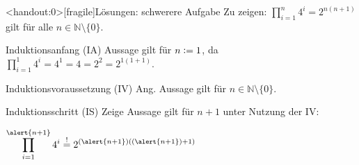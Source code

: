 {
\begin{frame}<handout:0>[fragile]{Lösungen: schwerere Aufgabe}
    Zu zeigen: $\displaystyle\prod_{i=1}^{n} 4^i = 2^{n(n+1)}$ gilt für alle $n \in \mathbb{N}\setminus \{0\}$.
    \begin{alertblock}{Induktionsanfang (IA)}
        Aussage gilt für $n\vcentcolon= 1$, da $\displaystyle\prod_{i=1}^{1} 4^i = 4^1 = 4 = 2^2 = 2^{1(1+1)}$.
    \end{alertblock}
    \begin{alertblock}{Induktionsvoraussetzung (IV)}
        Ang. Aussage gilt für $n \in\mathbb{N}\setminus \{0\}$.
    \end{alertblock}
    \begin{alertblock}{Induktionsschritt (IS)}
        Zeige Aussage gilt für $n+1$ unter Nutzung der IV:\par
        $\displaystyle\prod_{i=1}^{\alert{n+1}} 4^i \overset{!}{=} 2^{(\alert{n+1})((\alert{n+1})+1)}$
    \end{alertblock}
\end{frame}

}
